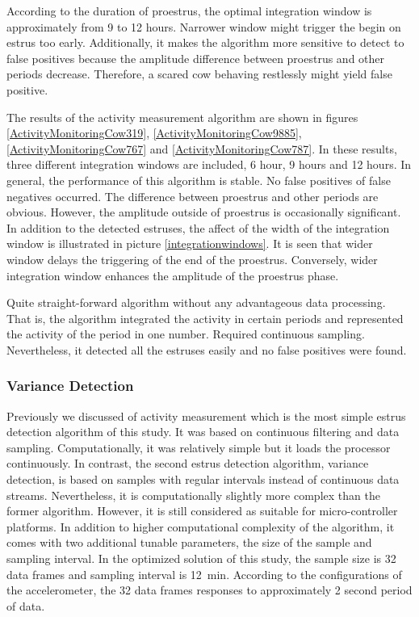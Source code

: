 \documentclass[english,12pt,a4paper,pdftex,elec,utf8]{aaltothesis}
\begin{document}
According to the duration of proestrus, the optimal integration window is approximately from 9 to 12 hours. Narrower window might trigger the begin on estrus too early. Additionally, it makes the algorithm more sensitive to detect to false positives because the amplitude difference between proestrus and other periods decrease. Therefore, a scared cow behaving restlessly might yield false positive.

The results of the activity measurement algorithm are shown in figures \ref{ActivityMonitoringCow319}, \ref{ActivityMonitoringCow9885}, \ref{ActivityMonitoringCow767} and \ref{ActivityMonitoringCow787}. In these results, three different integration windows are included, 6 hour, 9 hours and 12 hours. In general, the performance of this algorithm is stable. No false positives of false negatives occurred. The difference between proestrus and other periods are obvious. However, the amplitude outside of proestrus is occasionally significant. In addition to the detected estruses, the affect of the width of the integration window is illustrated in picture \ref{integrationwindows}. It is seen that wider window delays the triggering of the end of the proestrus. Conversely, wider integration window enhances the amplitude of the proestrus phase. 

Quite straight-forward algorithm without any advantageous data processing. That is, the algorithm integrated the activity in certain periods and represented the activity of the period in one number. Required continuous sampling. Nevertheless, it detected all the estruses easily and no false positives were found. \\


\subsubsection{Variance Detection} \label{variancedetectionevaluation}




Previously we discussed of activity measurement which is the most simple estrus detection algorithm of this study. It was based on continuous filtering and data sampling. Computationally, it was relatively simple but it loads the processor continuously. In contrast, the second estrus detection algorithm, variance detection, is based on samples with regular intervals instead of continuous data streams. Nevertheless, it is computationally slightly more complex than the former algorithm. However, it is still considered as suitable for micro-controller platforms. In addition to higher computational complexity of the algorithm, it comes with two additional tunable parameters, the size of the sample and sampling interval. In the optimized solution of this study, the sample size is 32 data frames and sampling interval is \SI{12}{\minute}. According to the configurations of the accelerometer, the 32 data frames responses to approximately 2 second period of data. 
\end{document}
